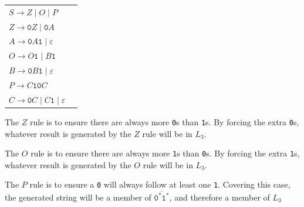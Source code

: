 \documentclass{article}
\begin{document}
        \begin{center}
        \begin{tabular}{ll}
            $S \longrightarrow Z \mid O \mid P$ \\
            $Z \longrightarrow \texttt{0}Z \mid \texttt{0}A$ \\
            $A \longrightarrow \texttt{0}A\texttt{1} \mid \varepsilon$ \\
            $O \longrightarrow O\texttt{1} \mid B\texttt{1}$ \\
            $B \longrightarrow \texttt{0}B\texttt{1} \mid \varepsilon$ \\
            $P \longrightarrow C\texttt{10}C$ \\
            $C \longrightarrow \texttt{0}C \mid C\texttt{1} \mid \varepsilon$
        \end{tabular}
        \end{center}

        The $Z$ rule is to ensure there are always more \texttt{0}s than \texttt{1}s. By forcing the extra \texttt{0}s, whatever result is generated by the $Z$ rule will be in $L_3$.

        The $O$ rule is to ensure there are always more \texttt{1}s than \texttt{0}s. By forcing the extra \texttt{1}s, whatever result is generated by the $O$ rule will be in $L_3$.

        The $P$ rule is to ensure a \texttt{0} will always follow at least one \texttt{1}. Covering this case, the generated string will be a member of $\overline{\texttt{0}^* \texttt{1}^*}$, and therefore a member of $L_3$






    
\end{document}

